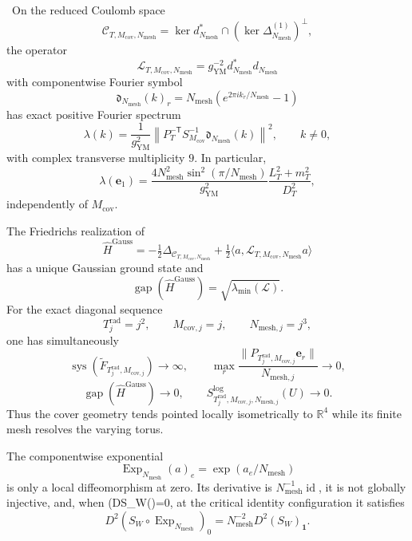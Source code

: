 \begin{auditrecord}
\Verified\ On the reduced Coulomb space
\[
 \mathscr C_{T,M_{\mathrm{cov}},N_{\mathrm{mesh}}}
 =\ker d_{N_{\mathrm{mesh}}}^*\cap
 (\ker\Delta^{(1)}_{N_{\mathrm{mesh}}})^\perp,
\]
the operator
\[
 \mathcal L_{T,M_{\mathrm{cov}},N_{\mathrm{mesh}}}
 =g_{\mathrm{YM}}^{-2}d_{N_{\mathrm{mesh}}}^*
 d_{N_{\mathrm{mesh}}}
\]
with componentwise Fourier symbol
\[
 \mathfrak d_{N_{\mathrm{mesh}}}(k)_r
 =N_{\mathrm{mesh}}
 \left(e^{2\pi i k_r/N_{\mathrm{mesh}}}-1\right)
\]
has exact positive Fourier spectrum
\[
 \lambda(k)=\frac1{g_{\mathrm{YM}}^2}
 \left\lVert P_T^{-\mathsf T}S_{M_{\mathrm{cov}}}^{-1}
 \mathfrak d_{N_{\mathrm{mesh}}}(k)\right\rVert^2,\qquad k\ne0,
\]
with complex transverse multiplicity \(9\).  In particular,
\[
 \lambda(\mathbf e_1)=
 \frac{4N_{\mathrm{mesh}}^2\sin^2(\pi/N_{\mathrm{mesh}})}
 {g_{\mathrm{YM}}^2}
 \frac{L_T^2+m_T^2}{D_T^2},
\]
independently of \(M_{\mathrm{cov}}\).

The Friedrichs realization of
\[
 \widehat H^{\mathrm{Gauss}}
 =-\tfrac12\Delta_{\mathscr C_{T,M_{\mathrm{cov}},N_{\mathrm{mesh}}}}
 +\tfrac12\langle
 a,\mathcal L_{T,M_{\mathrm{cov}},N_{\mathrm{mesh}}}a\rangle
\]
has a unique Gaussian ground state and
\[
 \operatorname{gap}(\widehat H^{\mathrm{Gauss}})
 =\sqrt{\lambda_{\min}(\mathcal L)}.
\]
For the exact diagonal sequence
\[
 T_j^{\mathrm{rad}}=j^2,\qquad M_{\mathrm{cov},j}=j,\qquad
 N_{\mathrm{mesh},j}=j^3,
\]
one has simultaneously
\[
 \operatorname{sys}(\widetilde F_{T_j^{\mathrm{rad}},M_{\mathrm{cov},j}})
 \to\infty,
 \qquad
 \max_r\frac{\lVert P_{T_j^{\mathrm{rad}},M_{\mathrm{cov},j}}\mathbf e_r\rVert}
 {N_{\mathrm{mesh},j}}\to0,
\]
\[
 \operatorname{gap}(\widehat H^{\mathrm{Gauss}})\to0,
 \qquad
 S^{\log}_{T_j^{\mathrm{rad}},M_{\mathrm{cov},j},N_{\mathrm{mesh},j}}(U)
 \to0.
\]
Thus the cover geometry tends pointed locally isometrically to
\(\mathbb R^4\) while its finite mesh resolves the varying torus.

The componentwise exponential
\[
 \operatorname{Exp}_{N_{\mathrm{mesh}}}(a)_e
 =\exp(a_e/N_{\mathrm{mesh}})
\]
is only a local diffeomorphism at zero.  Its derivative is
\(N_{\mathrm{mesh}}^{-1}\operatorname{id}\), it is not globally injective,
and, when (DS_W()=0\), at the critical identity configuration it
satisfies
\[
 D^2(S_W\circ\operatorname{Exp}_{N_{\mathrm{mesh}}})_0
 =N_{\mathrm{mesh}}^{-2}D^2(S_W)_{\mathbf1}.
\]


\end{auditrecord}
